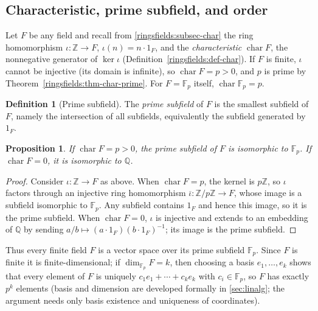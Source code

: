 \documentclass[11pt,a4paper]{article}
\newtheorem{proposition}[theorem]{Proposition}
\theoremstyle{definition}
\newtheorem{definition}[theorem]{Definition}
\theoremstyle{remark}
\newcommand{\Z}{\ensuremath{\mathbb{Z}}}
\newcommand{\Q}{\ensuremath{\mathbb{Q}}}
\newcommand{\Fp}{\ensuremath{\mathbb{F}_{p}}}
\begin{document}
\subsection{Characteristic, prime subfield, and order}
\label{finitefields:subsec:char}

Let \(F\) be any field and recall from \cref{ringsfields:subsec-char} the ring homomorphism \(\iota\colon \Z \to F\), \(\iota(n) = n\cdot 1_F\), and the \emph{characteristic} \(\operatorname{char} F\), the nonnegative generator of \(\ker\iota\) (Definition~\ref{ringsfields:def-char}). If \(F\) is finite, \(\iota\) cannot be injective (its domain is infinite), so \(\operatorname{char} F = p > 0\), and \(p\) is prime by Theorem~\ref{ringsfields:thm-char-prime}. For \(F = \Fp\) itself, \(\operatorname{char} \Fp = p\).

\begin{definition}[Prime subfield]
\label{finitefields:def:primesubfield}
The \emph{prime subfield} of \(F\) is the smallest subfield of \(F\), namely the intersection of all subfields, equivalently the subfield generated by \(1_F\).
\end{definition}

\begin{proposition}
\label{finitefields:prop:primesub}
If \(\operatorname{char} F = p > 0\), the prime subfield of \(F\) is isomorphic to \(\Fp\). If \(\operatorname{char} F = 0\), it is isomorphic to \(\Q\).
\end{proposition}

\begin{proof}
Consider \(\iota\colon \Z \to F\) as above. When \(\operatorname{char} F = p\), the kernel is \(p\Z\), so \(\iota\) factors through an injective ring homomorphism \(\overline\iota\colon \Z/p\Z \to F\), whose image is a subfield isomorphic to \(\Fp\). Any subfield contains \(1_F\) and hence this image, so it is the prime subfield. When \(\operatorname{char} F = 0\), \(\iota\) is injective and extends to an embedding of \(\Q\) by sending \(a/b \mapsto (a\cdot 1_F)(b\cdot 1_F)^{-1}\); its image is the prime subfield.
\end{proof}

Thus every finite field \(F\) is a vector space over its prime subfield \(\Fp\). Since \(F\) is finite it is finite-dimensional; if \(\dim_{\Fp} F = k\), then choosing a basis \(e_1, \dots, e_k\) shows that every element of \(F\) is uniquely \(c_1 e_1 + \cdots + c_k e_k\) with \(c_i \in \Fp\), so \(F\) has exactly \(p^k\) elements (basis and dimension are developed formally in \cref{sec:linalg}; the argument needs only basis existence and uniqueness of coordinates).
\end{document}
